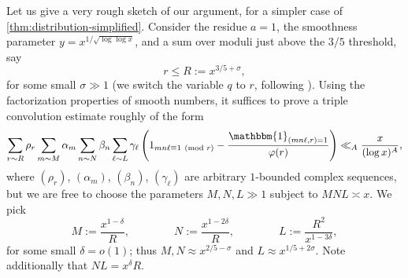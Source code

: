 \documentclass[reqno,11pt]{amsart}
\theoremstyle{definition}
\theoremstyle{remark}
\numberwithin{equation}{section}
\newcommand{\one}{\mathbbm{1}}
\renewcommand{\pmod}[1]{\ (\textnormal{mod } #1)}
\begin{document}
Let us give a very rough sketch of our argument, for a simpler case of \cref{thm:distribution-simplified}. Consider the residue $a = 1$, the smoothness parameter $y = x^{1/\sqrt{\log \log x}}$, and a sum over moduli just above the $3/5$ threshold, say
\[
    r \le R := x^{3/5 + \sigma},
\]
for some small $\sigma \gg 1$ (we switch the variable $q$ to $r$, following \cite{drappeau2015theoremes,drappeau2017smooth}). 
Using the factorization properties of smooth numbers, it suffices to prove a triple convolution estimate roughly of the form
\begin{equation} \label{eq:sketch-triple-conv}
    \sum_{r \sim R} \rho_r \sum_{m \sim M} \alpha_m
    \sum_{n \sim N} \beta_n
    \sum_{\ell \sim L} \gamma_\ell \left(1_{mn\ell \equiv 1 \pmod{r}} - \frac{\one_{(mn\ell, r)=1}}{\varphi(r)} \right)
    \ll_A
    \frac{x}{(\log x)^A},
\end{equation}
where $(\rho_r)$, $(\alpha_m)$, $(\beta_n)$, $(\gamma_\ell)$ are arbitrary $1$-bounded complex sequences, but we are free to choose the parameters $M, N, L \gg 1$ subject to $MNL \asymp x$. We pick
\begin{equation} \label{eq:sketch-ranges}
    M := \frac{x^{1-\delta}}{R}, 
    \qquad\qquad
    N := \frac{x^{1-2\delta}}{R},
    \qquad\qquad 
    L := \frac{R^2}{x^{1-3\delta}},
\end{equation}
for some small $\delta = o(1)$; thus $M, N \approx x^{2/5-\sigma}$ and $L \approx x^{1/5+2\sigma}$. Note additionally that $NL = x^{\delta} R$.
\end{document}
